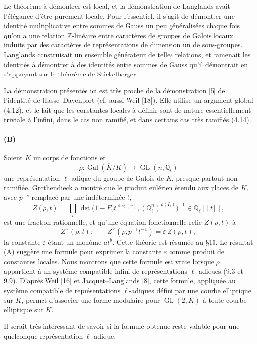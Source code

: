 \documentclass[10pt]{article}
\newcommand{\Q}{\mathbb Q}
\newcommand{\Z}{\mathbb Z}
\newcommand{\Gal}{\operatorname{Gal}}
\newcommand{\GL}{\operatorname{GL}}
\begin{document}
Le théorème à démontrer est local, et la démonstration de Langlands avait l'élégance d'être purement locale. Pour l'essentiel, il s'agit de démontrer une identité multiplicative entre sommes de Gauss un peu généralisées chaque fois qu'on a une relation \(\Z\)-linéaire entre caractères de groupes de Galois locaux induits par des caractères de représentations de dimension un de sous-groupes. Langlands construisait un ensemble générateur de telles relations, et ramenait les identités à démontrer à des identités entre sommes de Gauss qu'il démontrait en s'appuyant sur le théorème de Stickelberger.

La démonstration présentée ici est très proche de la démonstration [5] de l'identité de Hasse--Davenport (cf. aussi Weil [18]). Elle utilise un argument global (4.12), et le fait que les constantes locales à définir sont de nature essentiellement triviale à l'infini, dans le cas non ramifié, et dans certains cas très ramifiés (4.14).

\paragraph{(B)} Soient \(K\) un corps de fonctions et
\[
\rho:\Gal(\overline K/K)\longrightarrow \GL(n,\Q_\ell)
\]
une représentation \(\ell\)-adique du groupe de Galois de \(K\), presque partout non ramifiée. Grothendieck a montré que le produit eulérien étendu aux places de \(K\), avec \(p^{-s}\) remplacé par une indéterminée \(t\),
\[
Z(\rho,t)=\prod_v\det\bigl(1-F_vt^{\deg(v)},(\Q_\ell^n)^{\rho(I_v)}\bigr)^{-1}
\in\Q_\ell[[t]],
\]
est une fraction rationnelle, et qu'une équation fonctionnelle relie \(Z(\rho,t)\) à
\[
Z^\vee(\rho,t):
\qquad
Z^\vee(\rho,p^{-1}t^{-1})=\varepsilon\, Z(\rho,t),
\]
la constante \(\varepsilon\) étant un monôme \(at^b\). Cette théorie est résumée au §10. Le résultat (A) suggère une formule pour exprimer la constante \(\varepsilon\) comme produit de constantes locales. Nous montrons que cette formule est vraie lorsque \(\rho\) appartient à un système compatible infini de représentations \(\ell\)-adiques (9.3 et 9.9). D'après Weil [16] et Jacquet--Langlands [8], cette formule, appliquée au système compatible de représentations \(\ell\)-adiques défini par une courbe elliptique sur \(K\), permet d'associer une forme modulaire pour \(\GL(2,K)\) à toute courbe elliptique sur \(K\).

Il serait très intéressant de savoir si la formule obtenue reste valable pour une quelconque représentation \(\ell\)-adique.
\end{document}
